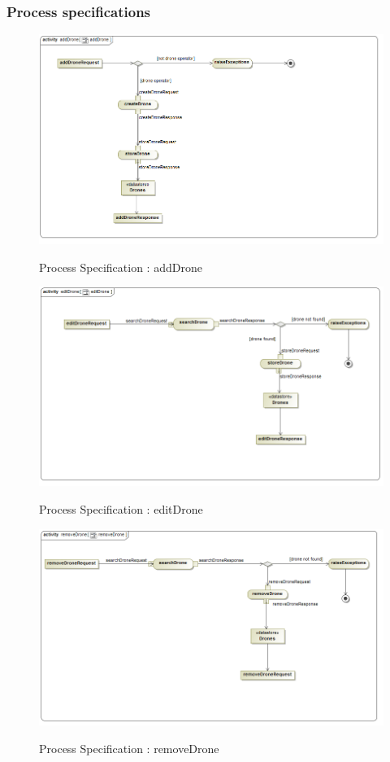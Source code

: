 \documentclass{article}
\begin{document}
	\subsubsection{Process specifications}
	
		\begin{figure}[H]
			\includegraphics[width=\textwidth]{ps_add.png}  \\
			\caption{Process Specification : addDrone}
		\end{figure}
		\begin{figure}[H]
			\includegraphics[width=\textwidth]{ps_edit.png}  \\
			\caption{Process Specification : editDrone}
		\end{figure}
		\begin{figure}[H]
			\includegraphics[width=\textwidth]{ps_delete.png}  \\
			\caption{Process Specification : removeDrone}
		\end{figure}
		
\end{document}
